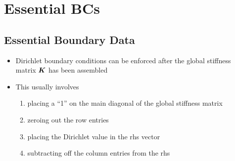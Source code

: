 \section{Essential BCs}



\subsection*{Essential Boundary Data}
\begin{frame}[t]
  \begin{block}{
    }
  \begin{itemize}
  \item {Dirichlet boundary conditions can be enforced after 
    the global stiffness matrix ${\boldsymbol{K}}$ has been assembled}
  \item This usually involves
    \begin{enumerate}
    \item<1-> placing a ``1'' on the main diagonal of the
      global stiffness matrix
    \item<2-> zeroing out the row entries
    \item<3-> placing the Dirichlet
      value in the rhs vector
    \item<4-> subtracting off the column entries from the rhs
    \end{enumerate}
  \end{itemize}
  \end{block}

\end{frame}



